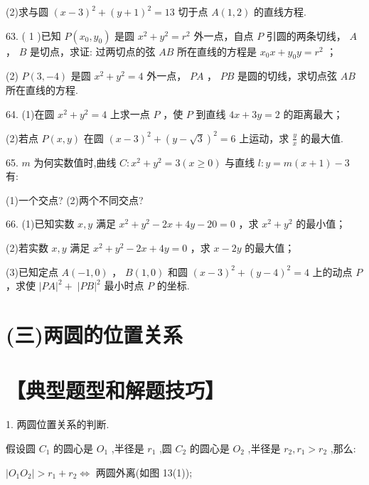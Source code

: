 \documentclass[10pt]{article}
\begin{document}
(2)求与圆 \({\left( x - 3\right) }^{2} + {\left( y + 1\right) }^{2} = {13}\) 切于点 \(A\left( {1,2}\right)\) 的直线方程.

63. ( 1 )已知 \(P\left( {{x}_{0},{y}_{0}}\right)\) 是圆 \({x}^{2} + {y}^{2} = {r}^{2}\) 外一点，自点 \(P\) 引圆的两条切线， \(A\) ， \(B\) 是切点，求证: 过两切点的弦 \({AB}\) 所在直线的方程是 \({x}_{0}x + {y}_{0}y = {r}^{2}\) ；

(2) \(P\left( {3, - 4}\right)\) 是圆 \({x}^{2} + {y}^{2} = 4\) 外一点， \({PA}\) ， \({PB}\) 是圆的切线，求切点弦 \({AB}\) 所在直线的方程.

64. (1)在圆 \({x}^{2} + {y}^{2} = 4\) 上求一点 \(P\) ，使 \(P\) 到直线 \({4x} + {3y} = 2\) 的距离最大；

(2)若点 \(P\left( {x,y}\right)\) 在圆 \({\left( x - 3\right) }^{2} + {\left( y - \sqrt{3}\right) }^{2} = 6\) 上运动，求 \(\frac{y}{x}\) 的最大值.

65. \(m\) 为何实数值时,曲线 \(C : {x}^{2} + {y}^{2} = 3\left( {x \geq  0}\right)\) 与直线 \(l : y = m\left( {x + 1}\right)  - 3\) 有:

(1)一个交点? (2)两个不同交点?

66. (1)已知实数 \(x,y\) 满足 \({x}^{2} + {y}^{2} - {2x} + {4y} - {20} = 0\) ，求 \({x}^{2} + {y}^{2}\) 的最小值；

(2)若实数 \(x,y\) 满足 \({x}^{2} + {y}^{2} - {2x} + {4y} = 0\) ，求 \(x - {2y}\) 的最大值；

(3)已知定点 \(A\left( {-1,0}\right)\) ， \(B\left( {1,0}\right)\) 和圆 \({\left( x - 3\right) }^{2} + {\left( y - 4\right) }^{2} = 4\) 上的动点 \(P\) ，求使 \({\left| PA\right| }^{2} + \; {\left| PB\right| }^{2}\) 最小时点 \(P\) 的坐标.

\section*{(三)两圆的位置关系}

\section*{【典型题型和解题技巧】}

1. 两圆位置关系的判断.

假设圆 \({C}_{1}\) 的圆心是 \({O}_{1}\) ,半径是 \({r}_{1}\) ,圆 \({C}_{2}\) 的圆心是 \({O}_{2}\) ,半径是 \({r}_{2},{r}_{1} > {r}_{2}\) ,那么:

\(\left| {{O}_{1}{O}_{2}}\right|  > {r}_{1} + {r}_{2} \Leftrightarrow\) 两圆外离(如图 13(1));
\end{document}
